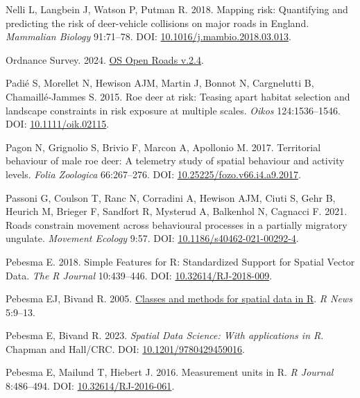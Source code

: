 \documentclass[10pt,a4paper]{article}
\newlength{\cslhangindent}
\newenvironment{CSLReferences}[2] %
 {\begin{list}{}{%
  \setlength{\itemindent}{0pt}
  \setlength{\leftmargin}{0pt}
  \setlength{\parsep}{0pt}
  \ifodd #1
   \setlength{\leftmargin}{\cslhangindent}
   \setlength{\itemindent}{-1\cslhangindent}
  \fi
  \setlength{\itemsep}{#2\baselineskip}}}
 {\end{list}}
\begin{document}
\begin{CSLReferences}{1}{0}
Nelli L, Langbein J, Watson P, Putman R. 2018. Mapping risk: {Quantifying} and predicting the risk of deer-vehicle collisions on major roads in {England}. \emph{Mammalian Biology} 91:71--78. DOI: \href{https://doi.org/10.1016/j.mambio.2018.03.013}{10.1016/j.mambio.2018.03.013}.

Ordnance Survey. 2024. \href{https://osdatahub.os.uk/downloads/open/OpenRoads}{{OS} {Open} {Roads} v.2.4}.

Padié S, Morellet N, Hewison AJM, Martin J, Bonnot N, Cargnelutti B, Chamaillé‐Jammes S. 2015. Roe deer at risk: Teasing apart habitat selection and landscape constraints in risk exposure at multiple scales. \emph{Oikos} 124:1536--1546. DOI: \href{https://doi.org/10.1111/oik.02115}{10.1111/oik.02115}.

Pagon N, Grignolio S, Brivio F, Marcon A, Apollonio M. 2017. Territorial behaviour of male roe deer: A telemetry study of spatial behaviour and activity levels. \emph{Folia Zoologica} 66:267--276. DOI: \href{https://doi.org/10.25225/fozo.v66.i4.a9.2017}{10.25225/fozo.v66.i4.a9.2017}.

Passoni G, Coulson T, Ranc N, Corradini A, Hewison AJM, Ciuti S, Gehr B, Heurich M, Brieger F, Sandfort R, Mysterud A, Balkenhol N, Cagnacci F. 2021. Roads constrain movement across behavioural processes in a partially migratory ungulate. \emph{Movement Ecology} 9:57. DOI: \href{https://doi.org/10.1186/s40462-021-00292-4}{10.1186/s40462-021-00292-4}.

Pebesma E. 2018. {Simple Features for R: Standardized Support for Spatial Vector Data}. \emph{{The R Journal}} 10:439--446. DOI: \href{https://doi.org/10.32614/RJ-2018-009}{10.32614/RJ-2018-009}.

Pebesma EJ, Bivand R. 2005. \href{https://CRAN.R-project.org/doc/Rnews/}{Classes and methods for spatial data in {R}}. \emph{R News} 5:9--13.

Pebesma E, Bivand R. 2023. \emph{{Spatial Data Science: With applications in R}}. {Chapman and Hall/CRC}. DOI: \href{https://doi.org/10.1201/9780429459016}{10.1201/9780429459016}.

Pebesma E, Mailund T, Hiebert J. 2016. Measurement units in {R}. \emph{R Journal} 8:486--494. DOI: \href{https://doi.org/10.32614/RJ-2016-061}{10.32614/RJ-2016-061}.


\end{CSLReferences}
\end{document}
